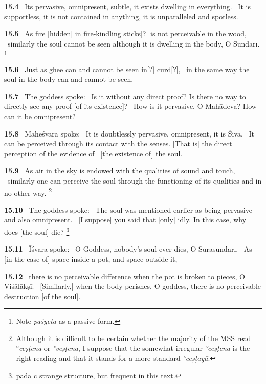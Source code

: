 \documentclass{article}
\newcommand{\skt}[1]{\textit{#1}}
\begin{document}
\textbf{15.4}%
\ Its pervasive, omnipresent, subtle, it exists dwelling in everything.%
\                  It is supportless, it is not contained in anything, it is unparalleled and spotless.%


\textbf{15.5}%
\ As fire [hidden] in fire-kindling sticks[?] is not perceivable in the wood,%
\                 similarly the soul cannot be seen although it is dwelling in the body, O Sundarī.%
\footnote{Note \skt{paśyeta} as a passive form. }%


\textbf{15.6}%
\ Just as ghee can and cannot be seen in[?] curd[?],%
\                  in the same way the soul in the body can and cannot be seen.%


\textbf{15.7}%
\ The goddess spoke:%
\ Is it without any direct proof? Is there no way to directly see any proof [of its existence]?%
\                  How is it pervasive, O Mahādeva? How can it be omnipresent?%


\textbf{15.8}%
\ Maheśvara spoke:%
\ It is doubtlessly pervasive, omnipresent, it is Śiva.%
\                   It can be perceived through its contact with the senses. [That is] the direct perception of the evidence of%
\                         [the existence of] the soul.%


\textbf{15.9}%
\ As air in the sky is endowed with the qualities of sound and touch,%
\                  similarly one can perceive the soul through the functioning of its qualities and in no other way.%
\footnote{Although it is difficult to be certain whether the majority of the MSS read °\skt{ceṣṭena} or \skt{°veṣṭena},                        I suppose that the somewhat irregular \skt{°ceṣṭena} is the right reading                         and that it stands for a more standard \skt{°ceṣṭayā}. }%


\textbf{15.10}%
\ The goddess spoke:%
\ The soul was mentioned earlier as being pervasive and also omnipresent.%
\                  [I suppose] you said that [only] idly. In this case, why does [the soul] die?%
\footnote{pāda c strange structure, but frequent in this text. }%


\textbf{15.11}%
\ Īśvara spoke:%
\ O Goddess, nobody's soul ever dies, O Surasundarī.%
\                  As [in the case of] space inside a pot, and space outside it,%


\textbf{15.12}%
\ there is no perceivable difference when the pot is broken to pieces, O Viśālākṣī.%
\                   [Similarly,] when the body perishes, O goddess, there is no perceivable destruction [of the soul].%
\end{document}
